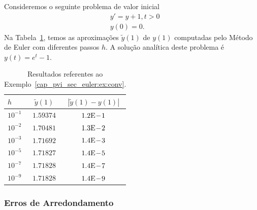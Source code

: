 \begin{ex}\label{cap_pvi_sec_euler:ex:conv}
  Consideremos o seguinte problema de valor inicial
  \begin{subequations}
    \begin{align}
      &y' = y + 1, t>0\\
      &y(0) = 0.
    \end{align}
\end{subequations}
  Na Tabela~\ref{cap_pvi_sec_euler:tab:euler_conv}, temos as aproximações $\tilde{y}(1)$ de $y(1)$ computadas pelo Método de Euler com diferentes passos $h$. A solução analítica deste problema é $y(t) = e^{t}-1$.
 
  \begin{table}[h!]
    \centering
    \caption{Resultados referentes ao Exemplo~\ref{cap_pvi_sec_euler:ex:conv}.}
    \begin{tabular}{l|cc}
      $h$ & $\tilde{y}(1)$ & $|\tilde{y}(1)-y(1)|$\\\hline
      $10^{-1}$ & $1.59374$ & $1.2\mathrm{E}\!-\!1$ \\
      $10^{-2}$ & $1.70481$ & $1.3\mathrm{E}\!-\!2$ \\
      $10^{-3}$ & $1.71692$ & $1.4\mathrm{E}\!-\!3$ \\
      $10^{-5}$ & $1.71827$ & $1.4\mathrm{E}\!-\!5$ \\
      $10^{-7}$ & $1.71828$ & $1.4\mathrm{E}\!-\!7$ \\
      $10^{-9}$ & $1.71828$ & $1.4\mathrm{E}\!-\!9$ \\\hline
    \end{tabular}
    \label{cap_pvi_sec_euler:tab:euler_conv}
  \end{table}
\end{ex}

\subsubsection{Erros de Arredondamento}

